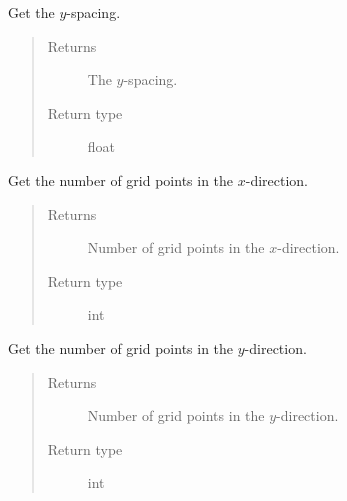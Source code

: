 \documentclass[letterpaper,10pt,english]{sphinxmanual}
\begin{document}
\begin{fulllineitems}

\begin{fulllineitems}
\label{\detokenize{api:grids.xyz_grid.XYZGrid.dy}}
Get the \(y\)-spacing.
\begin{quote}\begin{description}
\item[{Returns}] \leavevmode
The \(y\)-spacing.

\item[{Return type}] \leavevmode
float

\end{description}\end{quote}

\end{fulllineitems}


\begin{fulllineitems}
\label{\detokenize{api:grids.xyz_grid.XYZGrid.nx}}
Get the number of grid points in the \(x\)-direction.
\begin{quote}\begin{description}
\item[{Returns}] \leavevmode
Number of grid points in the \(x\)-direction.

\item[{Return type}] \leavevmode
int

\end{description}\end{quote}

\end{fulllineitems}


\begin{fulllineitems}
\label{\detokenize{api:grids.xyz_grid.XYZGrid.ny}}
Get the number of grid points in the \(y\)-direction.
\begin{quote}\begin{description}
\item[{Returns}] \leavevmode
Number of grid points in the \(y\)-direction.

\item[{Return type}] \leavevmode
int

\end{description}\end{quote}


\end{fulllineitems}
\end{fulllineitems}
\end{document}

